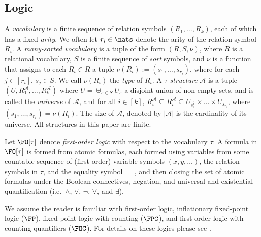\documentclass[a4paper,UKenglish]{lipics-v2018}
\begin{document}
\subsection{Logic}
A \emph{vocabulary} is a finite sequence of relation symbols $(R_1, \ldots,
R_k)$, each of which has a fixed \emph{arity}. We often let $r_i \in \nats$
denote the arity of the relation symbol $R_i$. A \emph{many-sorted vocabulary}
is a tuple of the form $(R, S, \nu)$, where $R$ is a relational vocabulary, $S$
is a finite sequence of \emph{sort} symbols, and $\nu$ is a function that
assigns to each $R_i \in R$ a tuple $\nu(R_i) := (s_1, \ldots, s_{r_i})$, where
for each $j \in [r_i]$, $s_j \in S$. We call $\nu(R_i)$ the \emph{type} of
$R_i$. A \emph{$\tau$-structure} $\mathcal{A}$ is a tuple $(U ,
R^{\mathcal{A}}_1 , \ldots , R^{\mathcal{A}}_k)$ where $U = \uplus_{s \in S }
U_{s}$ a disjoint union of non-empty sets, and is called the \emph{universe} of
$\mathcal{A}$, and for all $i \in [k]$, $R^{\mathcal{A}}_i \subseteq
R^{\mathcal{A}}_i \subseteq U_{s^i_1} \times \ldots \times U_{s_{r_i}}$, where
$(s_1 , \ldots , s_{r_i}) = \nu (R_i)$. The size of $\mathcal{A}$, denoted by
$\vert \mathcal{A} \vert$ is the cardinality of its universe. All structures in
this paper are finite.

Let $\FO[\tau]$ denote \emph{first-order logic} with respect to the vocabulary
$\tau$. A formula in $\FO[\tau]$ is formed from atomic formulas, each formed
using variables from some countable sequence of (first-order) variable symbols
$(x, y, \ldots)$, the relation symbols in $\tau$, and the equality symbol $=$,
and then closing the set of atomic formulas under the Boolean connectives,
negation, and universal and existential quantification (i.e.\ $\land$, $\lor$,
$\neg$, $\forall$, and $\exists$).

We assume the reader is familiar with first-order logic, inflationary
fixed-point logic ($\FP$), fixed-point logic with counting ($\FPC$), and
first-order logic with counting quantifiers ($\FOC$). For details on these
logics please see \cite{grohe2017descriptive, immerman1999descriptive}.
\end{document}

